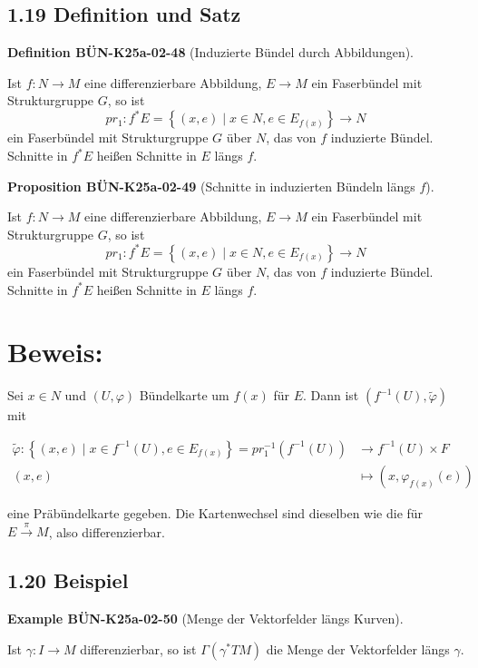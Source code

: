 \documentclass[10pt, letterpaper]{article}
\newcommand{\CustomHeading}[3]{%
  \par\medskip\noindent%
  \textbf{#1 #2} \textnormal{(#3)}.\enskip%
}
\newenvironment{DEF}[2]{\begin{unitbox}\CustomHeading{Definition}{#1}{#2}}{\end{unitbox}}
\newenvironment{PROP}[2]{\begin{unitbox}\CustomHeading{Proposition}{#1}{#2}}{\end{unitbox}}
\newenvironment{EXA}[2]{\begin{unitbox}\CustomHeading{Example}{#1}{#2}}{\end{unitbox}}
\begin{document}
\subsection*{1.19 Definition und Satz}
\begin{DEF}{BÜN-K25a-02-48}{Induzierte Bündel durch Abbildungen}
Ist $f: N \rightarrow M$ eine differenzierbare Abbildung, $E \rightarrow M$ ein Faserbündel mit Strukturgruppe $G$, so ist
$$
p r_{1}: f^{*} E=\left\{(x, e) \mid x \in N, e \in E_{f(x)}\right\} \rightarrow N
$$
ein Faserbündel mit Strukturgruppe $G$ über $N$, das von $f$ induzierte Bündel. Schnitte in $f^{*} E$ heißen Schnitte in $E$ längs $f$.
\end{DEF}


\begin{PROP}{BÜN-K25a-02-49}{Schnitte in induzierten Bündeln längs $f$}
Ist $f: N \rightarrow M$ eine differenzierbare Abbildung, $E \rightarrow M$ ein Faserbündel mit Strukturgruppe $G$, so ist
$$
p r_{1}: f^{*} E=\left\{(x, e) \mid x \in N, e \in E_{f(x)}\right\} \rightarrow N
$$
ein Faserbündel mit Strukturgruppe $G$ über $N$, das von $f$ induzierte Bündel. Schnitte in $f^{*} E$ heißen Schnitte in $E$ längs $f$.
\end{PROP}


\section*{Beweis:}
Sei $x \in N$ und $(U, \varphi)$ Bündelkarte um $f(x)$ für $E$. Dann ist $\left(f^{-1}(U), \tilde{\varphi}\right)$ mit

$$
\begin{aligned}
\tilde{\varphi}:\left\{(x, e) \mid x \in f^{-1}(U), e \in E_{f(x)}\right\}=p r_{1}^{-1}\left(f^{-1}(U)\right) & \longrightarrow f^{-1}(U) \times F \\
(x, e) & \mapsto\left(x, \varphi_{f(x)}(e)\right)
\end{aligned}
$$

eine Präbündelkarte gegeben. Die Kartenwechsel sind dieselben wie die für $E \xrightarrow{\pi} M$, also differenzierbar.


\subsection*{1.20 Beispiel}
\begin{EXA}{BÜN-K25a-02-50}{Menge der Vektorfelder längs Kurven}
Ist $\gamma: I \rightarrow M$ differenzierbar, so ist $\Gamma\left(\gamma^{*} T M\right)$ die Menge der Vektorfelder längs $\gamma$.
\end{EXA}
\end{document}
